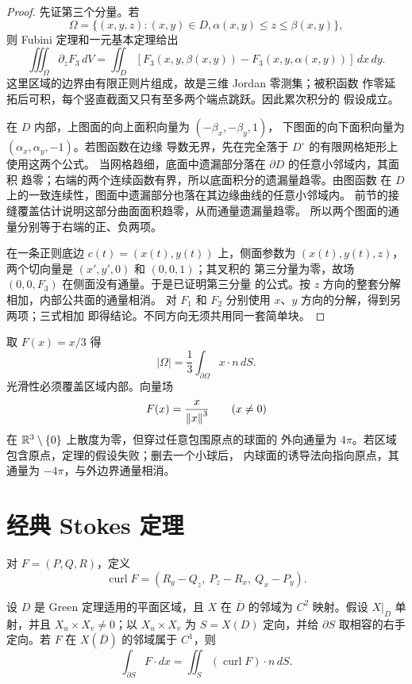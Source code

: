 \begin{proof}
先证第三个分量。若
\[
 \Omega=\{(x,y,z):(x,y)\in D,
          \alpha(x,y)\le z\le\beta(x,y)\},
\]
则 Fubini 定理和一元基本定理给出
\[
 \iiint_\Omega\partial_zF_3\,dV
 =\iint_D
  [F_3(x,y,\beta(x,y))-F_3(x,y,\alpha(x,y))]\,dx\,dy.
\]
这里区域的边界由有限正则片组成，故是三维 Jordan 零测集；被积函数
作零延拓后可积，每个竖直截面又只有至多两个端点跳跃。因此累次积分的
假设成立。

在 $D$ 内部，上图面的向上面积向量为 $(-\beta_x,-\beta_y,1)$，
下图面的向下面积向量为 $(\alpha_x,\alpha_y,-1)$。若图函数在边缘
导数无界，先在完全落于 $D^\circ$ 的有限网格矩形上使用这两个公式。
当网格趋细，底面中遗漏部分落在 $\partial D$ 的任意小邻域内，其面积
趋零；右端的两个连续函数有界，所以底面积分的遗漏量趋零。由图函数
在 $D$ 上的一致连续性，图面中遗漏部分也落在其边缘曲线的任意小邻域内。
前节的接缝覆盖估计说明这部分曲面面积趋零，从而通量遗漏量趋零。
所以两个图面的通量分别等于右端的正、负两项。

在一条正则底边 $c(t)=(x(t),y(t))$ 上，侧面参数为
$(x(t),y(t),z)$，两个切向量是 $(x',y',0)$ 和 $(0,0,1)$；其叉积的
第三分量为零，故场 $(0,0,F_3)$ 在侧面没有通量。于是已证明第三分量
的公式。按 $z$ 方向的整套分解相加，内部公共面的通量相消。
对 $F_1$ 和 $F_2$ 分别使用 $x$、$y$ 方向的分解，得到另两项；三式相加
即得结论。不同方向无须共用同一套简单块。
\end{proof}

取 \(F(x)=x/3\) 得
\[
 |\Omega|=\frac13\int_{\partial\Omega}x\cdot n\,dS.
\]
光滑性必须覆盖区域内部。向量场
\[
 F(x)=\frac{x}{\left\lVert x\right\rVert^3}\qquad(x\ne0)
\]
在 \(\mathbb{R}^3\setminus\{0\}\) 上散度为零，但穿过任意包围原点的球面的
外向通量为 \(4\pi\)。若区域包含原点，定理的假设失败；删去一个小球后，
内球面的诱导法向指向原点，其通量为 \(-4\pi\)，与外边界通量相消。

\section{经典 Stokes 定理}

对 \(F=(P,Q,R)\)，定义
\[
 \operatorname{curl}F=(R_y-Q_z,\ P_z-R_x,\ Q_x-P_y).
\]

\begin{theorem}[经典 Stokes 定理]
\label{thm:stokes-classical-surface}
设 \(D\) 是 Green 定理适用的平面区域，且
\(X\) 在 \(\overline D\) 的邻域为 \(C^2\) 映射。假设 \(X|_{\overline D}\)
单射，并且 \(X_u\times X_v\ne0\)；以 \(X_u\times X_v\) 为
\(S=X(D)\) 定向，并给 \(\partial S\) 取相容的右手定向。若 \(F\) 在
\(X(\overline D)\) 的邻域属于 \(C^1\)，则
\[
 \int_{\partial S}F\cdot dx
 =\iint_S(\operatorname{curl}F)\cdot n\,dS.
\]
\end{theorem}

